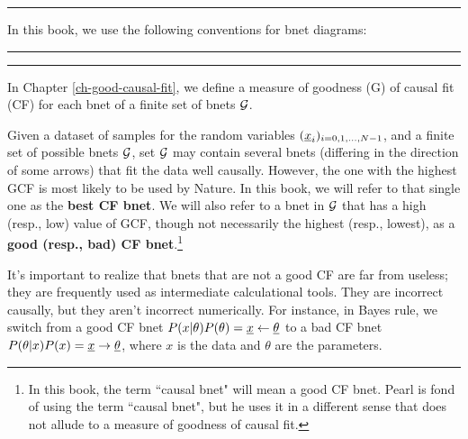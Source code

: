 \hrule
In this book,
we use the following conventions
for bnet diagrams:

\bnetInstantiations

\hrule
\hiddenNodes

\hrule
In  Chapter \ref{ch-good-causal-fit},
we define a measure
of goodness (G) of causal fit (CF)
for each bnet of a finite set of bnets ${\cal G}$.

Given a dataset of samples for
the random variables
$({\underline{x}}_i)_{i=0, 1, \ldots, N-1}$,
and a finite set of possible bnets ${\cal G}$,
set ${\cal G}$ may contain
several bnets (differing
in the direction
of some arrows) that
fit the data well causally. However,
the one with the highest
GCF is most likely to be used
by Nature.
In this book, we will refer to that
single one as the
{\bf best CF bnet}.
We will also refer to
a bnet in ${\cal G}$ that has a high (resp., low) value
of GCF, though not
necessarily the highest (resp., lowest),
as a {\bf good (resp., bad) CF bnet}.\footnote{
In  this book, the term ``causal bnet"
will mean a good CF bnet. Pearl is fond
of using the term ``causal bnet",
but he uses it in a different
sense that does not
allude to a measure of goodness of causal fit.}

It's important to realize
that bnets that are not a good CF
are far from useless; they
are frequently used
as intermediate calculational
tools. They are incorrect causally,
but they aren't incorrect numerically.
For instance, in Bayes rule,
we switch from a good CF bnet
$P(x|\theta)P(\theta)={\underline{x}}\leftarrow\underline{\theta}$
to a bad CF bnet
$P(\theta|x)P(x)={\underline{x}}\rightarrow\underline{\theta}$,
where $x$ is the data
and $\theta$ are the parameters.
